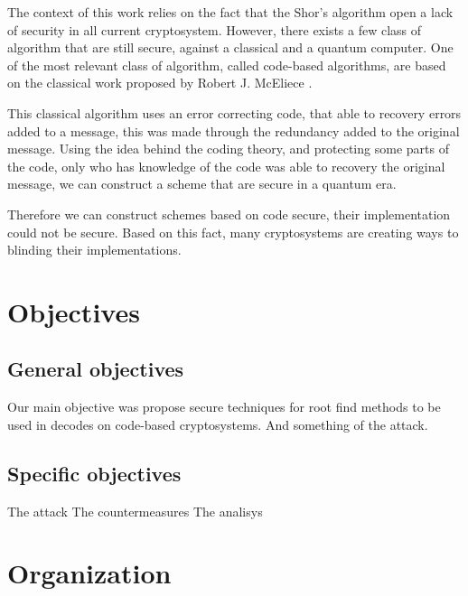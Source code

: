 The context of this work relies on the fact that the Shor's algorithm open a lack of security in all current cryptosystem. However, there exists a few class of algorithm that are still secure, against a classical and a quantum computer. One of the most relevant class of algorithm, called code-based algorithms, are based on the classical work proposed by Robert J. McEliece \cite{mceliece1978public}. 

This classical algorithm uses an error correcting code, that able to recovery errors added to a message, this was made through the redundancy added to the original message. Using the idea behind the coding theory, and protecting some parts of the code, only who has knowledge of the code was able to recovery the original message, we can construct a scheme that are secure in a quantum era.

Therefore we can construct schemes based on code secure, their implementation could not be secure. Based on this fact, many cryptosystems are creating ways to blinding their implementations. 


\section{Objectives}

\subsection{General objectives}
Our main objective was propose secure techniques for root find methods to be used in decodes on code-based cryptosystems. And something of the attack.
\subsection{Specific objectives}
The attack
The countermeasures
The analisys
\section{Organization}
